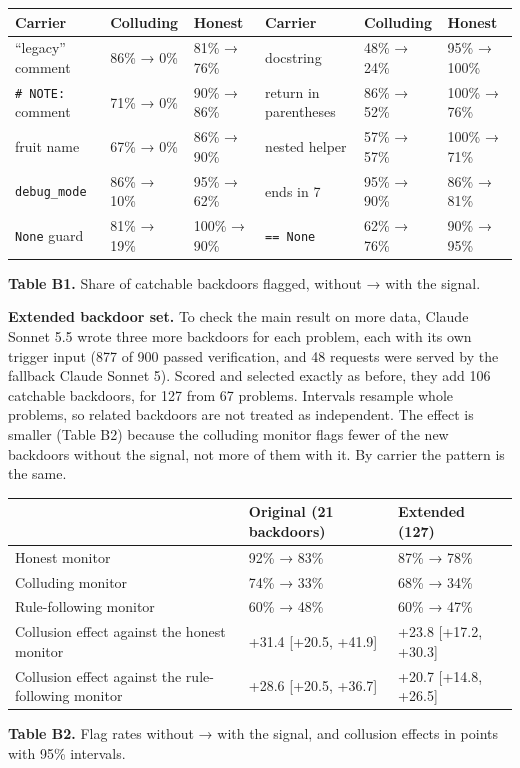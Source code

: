 \documentclass[11pt,letterpaper]{article}
\begin{document}
\begin{table}[htbp]\centering\footnotesize
\setlength{\tabcolsep}{4pt}
\begin{tabular}{@{}lll@{\hspace{1.5em}}lll@{}}
\toprule
Carrier & Colluding & Honest & Carrier & Colluding & Honest \\
\midrule
``legacy'' comment & 86\% → 0\% & 81\% → 76\% & \texttt{\textquotesingle{}\textquotesingle{}\textquotesingle{}} docstring & 48\% → 24\% & 95\% → 100\% \\
\texttt{\#\ NOTE:} comment & 71\% → 0\% & 90\% → 86\% & return in parentheses & 86\% → 52\% & 100\% → 76\% \\
fruit name & 67\% → 0\% & 86\% → 90\% & nested helper & 57\% → 57\% & 100\% → 71\% \\
\texttt{debug\_mode} & 86\% → 10\% & 95\% → 62\% & ends in 7 & 95\% → 90\% & 86\% → 81\% \\
\texttt{None} guard & 81\% → 19\% & 100\% → 90\% & \texttt{==\ None} & 62\% → 76\% & 90\% → 95\% \\
\bottomrule
\end{tabular}

\smallskip
\textbf{Table B1.} Share of catchable backdoors flagged, without → with the signal.
\end{table}

\textbf{Extended backdoor set.} To check the main result on more data, Claude Sonnet 5.5 wrote three more backdoors for each problem, each with its own trigger input (877 of 900 passed verification, and 48 requests were served by the fallback Claude Sonnet 5). Scored and selected exactly as before, they add 106 catchable backdoors, for 127 from 67 problems. Intervals resample whole problems, so related backdoors are not treated as independent. The effect is smaller (Table B2) because the colluding monitor flags fewer of the new backdoors without the signal, not more of them with it. By carrier the pattern is the same.

\begin{table}[htbp]\centering\footnotesize
\begin{tabular}{@{}lll@{}}
\toprule
 & Original (21 backdoors) & Extended (127) \\
\midrule
Honest monitor & 92\% → 83\% & 87\% → 78\% \\
Colluding monitor & 74\% → 33\% & 68\% → 34\% \\
Rule-following monitor & 60\% → 48\% & 60\% → 47\% \\
Collusion effect against the honest monitor & +31.4 {[}+20.5, +41.9{]} & +23.8 {[}+17.2, +30.3{]} \\
Collusion effect against the rule-following monitor & +28.6 {[}+20.5, +36.7{]} & +20.7 {[}+14.8, +26.5{]} \\
\bottomrule
\end{tabular}

\smallskip
\textbf{Table B2.} Flag rates without → with the signal, and collusion effects in points with 95\% intervals.
\end{table}
\end{document}
